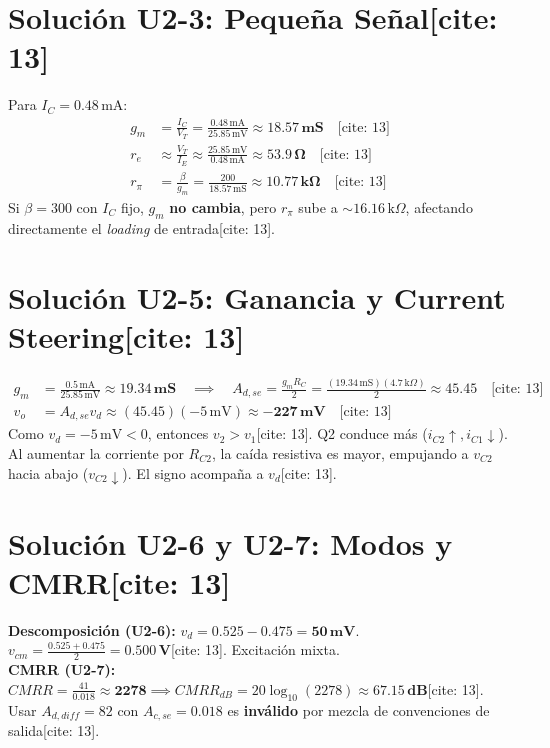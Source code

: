 \documentclass[11pt, a4paper]{article}
\begin{document}
\section*{Solución U2-3: Pequeña Señal[cite: 13]}
Para $I_C = 0.48\,\text{mA}$:
\begin{align*}
    g_m &= \frac{I_C}{V_T} = \frac{0.48\,\text{mA}}{25.85\,\text{mV}} \approx \mathbf{18.57\,\text{mS}} \quad \text{[cite: 13]} \\
    r_e &\approx \frac{V_T}{I_E} \approx \frac{25.85\,\text{mV}}{0.48\,\text{mA}} \approx \mathbf{53.9\,\Omega} \quad \text{[cite: 13]} \\
    r_\pi &= \frac{\beta}{g_m} = \frac{200}{18.57\,\text{mS}} \approx \mathbf{10.77\,\text{k}\Omega} \quad \text{[cite: 13]}
\end{align*}
Si $\beta=300$ con $I_C$ fijo, $g_m$ \textbf{no cambia}, pero $r_\pi$ sube a $\sim 16.16\,\text{k}\Omega$, afectando directamente el \textit{loading} de entrada[cite: 13].

\section*{Solución U2-5: Ganancia y Current Steering[cite: 13]}
\begin{align*}
    g_m &= \frac{0.5\,\text{mA}}{25.85\,\text{mV}} \approx \mathbf{19.34\,\text{mS}} \quad \implies \quad A_{d,se} = \frac{g_m R_C}{2} = \frac{(19.34\,\text{mS})(4.7\,\text{k}\Omega)}{2} \approx \mathbf{45.45} \quad \text{[cite: 13]} \\
    v_o &= A_{d,se} v_d \approx (45.45)(-5\,\text{mV}) \approx \mathbf{-227\,\text{mV}} \quad \text{[cite: 13]}
\end{align*}
Como $v_d = -5\,\text{mV} < 0$, entonces $v_2 > v_1$[cite: 13]. Q2 conduce más ($i_{C2} \uparrow, i_{C1} \downarrow$). Al aumentar la corriente por $R_{C2}$, la caída resistiva es mayor, empujando a $v_{C2}$ hacia abajo ($v_{C2} \downarrow$). El signo acompaña a $v_d$[cite: 13].

\section*{Solución U2-6 y U2-7: Modos y CMRR[cite: 13]}
\textbf{Descomposición (U2-6):} $v_d = 0.525 - 0.475 = \mathbf{50\,\text{mV}}$. $v_{cm} = \frac{0.525 + 0.475}{2} = \mathbf{0.500\,\text{V}}$[cite: 13]. Excitación mixta. \\
\textbf{CMRR (U2-7):} $CMRR = \frac{41}{0.018} \approx \mathbf{2278} \implies CMRR_{dB} = 20\log_{10}(2278) \approx \mathbf{67.15\,\text{dB}}$[cite: 13]. \\
Usar $A_{d,diff} = 82$ con $A_{c,se}=0.018$ es \textbf{inválido} por mezcla de convenciones de salida[cite: 13].
\end{document}
